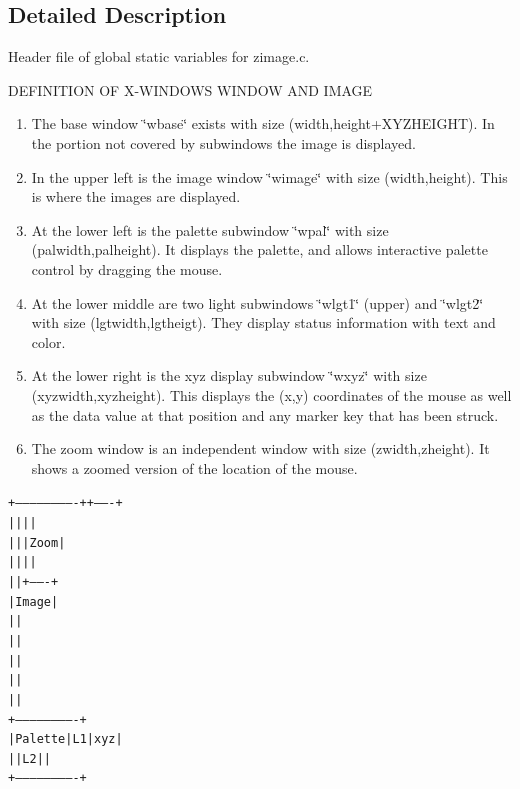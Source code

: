 \subsection{Detailed Description}
Header file of global static variables for zimage.c. 

DEFINITION OF X-WINDOWS WINDOW AND IMAGE

\begin{enumerate}
\item The base window \char`\"{}wbase\char`\"{} exists with size (width,height+XYZHEIGHT). In the portion not covered by subwindows the image is displayed.

\item In the upper left is the image window \char`\"{}wimage\char`\"{} with size (width,height). This is where the images are displayed.

\item At the lower left is the palette subwindow \char`\"{}wpal\char`\"{} with size (palwidth,palheight). It displays the palette, and allows interactive palette control by dragging the mouse.

\item At the lower middle are two light subwindows \char`\"{}wlgt1\char`\"{} (upper) and \char`\"{}wlgt2\char`\"{} with size (lgtwidth,lgtheigt). They display status information with text and color.

\item At the lower right is the xyz display subwindow \char`\"{}wxyz\char`\"{} with size (xyzwidth,xyzheight). This displays the (x,y) coordinates of the mouse as well as the data value at that position and any marker key that has been struck.

\item The zoom window is an independent window with size (zwidth,zheight). It shows a zoomed version of the location of the mouse. \end{enumerate}
\small\begin{alltt}
       +-------------------------+      +-------+
       |                         |      |       |
       |                         |      | Zoom  |
       |                         |      |       |
       |                         |      +-------+
       |        Image            |
       |                         |
       |                         |
       |                         |
       |                         |
       |                         |
       +-------------------------+
       | Palette | L1 | x y z    |
       |         | L2 |          |
       +-------------------------+
\end{alltt}\normalsize 


